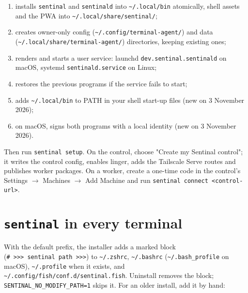 \begin{enumerate}
\item installs \texttt{sentinal} and \texttt{sentinald} into \texttt{\textasciitilde{}/\allowbreak{}.\allowbreak{}local/\allowbreak{}bin} atomically, shell assets and the PWA into \texttt{\textasciitilde{}/\allowbreak{}.\allowbreak{}local/\allowbreak{}share/\allowbreak{}sentinal/\allowbreak{}};
\item creates owner-only config (\texttt{\textasciitilde{}/\allowbreak{}.\allowbreak{}config/\allowbreak{}terminal-{}\allowbreak{}agent/\allowbreak{}}) and data (\texttt{\textasciitilde{}/\allowbreak{}.\allowbreak{}local/\allowbreak{}share/\allowbreak{}terminal-{}\allowbreak{}agent/\allowbreak{}}) directories, keeping existing ones;
\item renders and starts a user service: launchd \texttt{dev.\allowbreak{}sentinal.\allowbreak{}sentinald} on macOS, systemd \texttt{sentinald.\allowbreak{}service} on Linux;
\item restores the previous programs if the service fails to start;
\item adds \texttt{\textasciitilde{}/\allowbreak{}.\allowbreak{}local/\allowbreak{}bin} to PATH in your shell start-up files (new on 3 November 2026);
\item on macOS, signs both programs with a local identity (new on 3 November 2026).
\end{enumerate}

Then run \texttt{sentinal\ setup}. On the control, choose "Create my Sentinal control"; it writes the control config, enables linger, adds the Tailscale Serve routes and publishes worker packages. On a worker, create a one-time code in the control's Settings $\rightarrow$ Machines $\rightarrow$ Add Machine and run \texttt{sentinal\ connect\ \textless{}control-{}\allowbreak{}url\textgreater{}}.

\section{\texorpdfstring{\texttt{sentinal} in every terminal}{sentinal in every terminal}}

With the default prefix, the installer adds a marked block (\texttt{\#\ \textgreater{}\textgreater{}\textgreater{}\ sentinal\ path\ \textgreater{}\textgreater{}\textgreater{}}) to \texttt{\textasciitilde{}/\allowbreak{}.\allowbreak{}zshrc}, \texttt{\textasciitilde{}/\allowbreak{}.\allowbreak{}bashrc} (\texttt{\textasciitilde{}/\allowbreak{}.\allowbreak{}bash\_\allowbreak{}profile} on macOS), \texttt{\textasciitilde{}/\allowbreak{}.\allowbreak{}profile} when it exists, and \texttt{\textasciitilde{}/\allowbreak{}.\allowbreak{}config/\allowbreak{}fish/\allowbreak{}conf.\allowbreak{}d/\allowbreak{}sentinal.\allowbreak{}fish}. Uninstall removes the block; \texttt{SENTINAL\_\allowbreak{}NO\_\allowbreak{}MODIFY\_\allowbreak{}PATH=\allowbreak{}1} skips it. For an older install, add it by hand:

